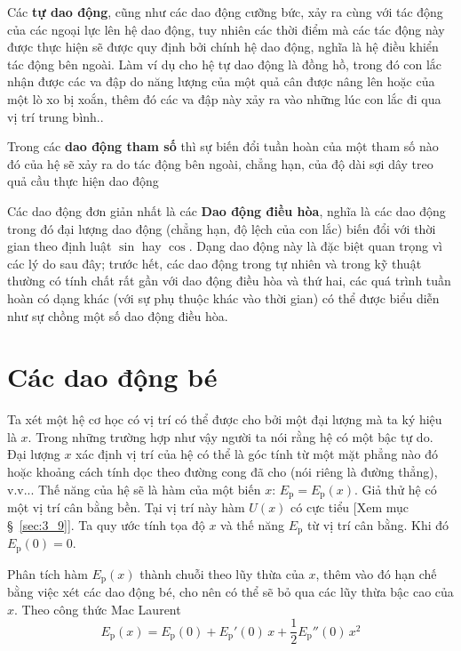 Các \textbf{tự dao động}, cũng như các dao động cưỡng bức, xảy ra cùng với tác động của các ngoại lực lên hệ dao động, tuy nhiên các thời điểm mà các tác động này được thực hiện sẽ được quy định bởi chính hệ dao động, nghĩa là hệ điều khiển tác động bên ngoài. Làm ví dụ cho hệ tự dao động là đồng hồ, trong đó con lắc nhận được các va đập do năng lượng của một quả cân được nâng lên hoặc của một lò xo bị xoắn, thêm đó các va đập này xảy ra vào những lúc con lắc đi qua vị trí trung bình..

Trong các \textbf{dao động tham số} thì sự biến đổi tuần hoàn của một tham số nào đó của hệ sẽ xảy ra do tác động bên ngoài, chẳng hạn, của độ dài sợi dây treo quả cầu thực hiện dao động

Các dao động đơn giản nhất là các \textbf{Dao động điều hòa}, nghĩa là các dao động trong đó đại lượng dao động (chẳng hạn, độ lệch của con lắc) biến đổi với thời gian theo định luật $\sin$ hay $\cos$. Dạng dao động này là đặc biệt quan trọng vì các lý do sau đây; trước hết, các dao động trong tự nhiên và trong kỹ thuật thường có tính chất rất gần với dao động điều hòa và thứ hai, các quá trình tuần hoàn có dạng khác (với sự phụ thuộc khác vào thời gian) có thể được biểu diễn như sự chồng một số dao động điều hòa.

\section{Các dao động bé}\label{sec:7_2}

Ta xét một hệ cơ học có vị trí có thể được cho bởi một đại lượng mà ta ký hiệu là $x$. Trong những trường hợp như vậy người ta nói rằng hệ có một bậc tự do. Đại lượng $x$ xác định vị trí của hệ có thể là góc tính từ một mặt phẳng nào đó hoặc khoảng cách tính dọc theo đường cong đã cho (nói riêng là đường thẳng), v.v... Thế năng của hệ sẽ là hàm của một biến $x$: $E_{\text{p}}=E_{\text{p}}(x)$. Giả thử hệ có một vị trí cân bằng bền. Tại vị trí này hàm $U(x)$ có cực tiểu [Xem mục \S~\ref{sec:3_9}]. Ta quy ước tính tọa độ $x$ và thế năng $E_{\text{p}}$ từ vị trí cân bằng. Khi đó $E_{\text{p}}(0)=0$.

Phân tích hàm $E_{\text{p}}(x)$ thành chuỗi theo lũy thừa của $x$, thêm vào đó hạn chế bằng việc xét các dao động bé, cho nên có thể sẽ bỏ qua các lũy thừa bậc cao của $x$. Theo công thức Mac Laurent
\begin{equation*}
	E_{\text{p}}(x) = E_{\text{p}}(0) + E_{\text{p}}'(0)\,x + \frac{1}{2}E_{\text{p}}''(0)\,x^2
\end{equation*}

